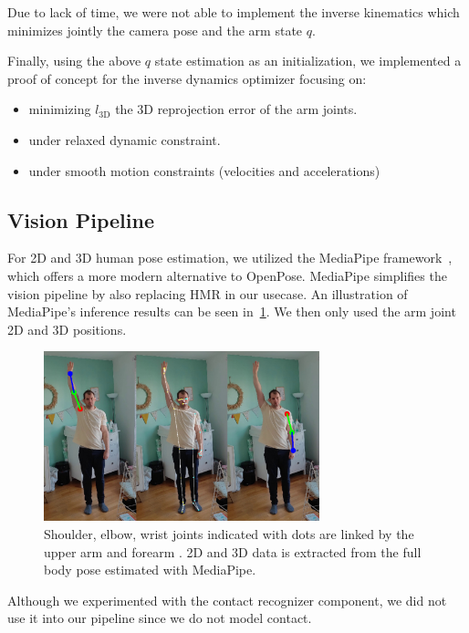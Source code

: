 Due to lack of time, we were not able to implement the inverse kinematics which minimizes jointly
the camera pose and the arm state $q$.

Finally, using the above $q$ state estimation as an initialization,
we implemented a proof of concept for the inverse dynamics optimizer focusing on:
\begin{itemize}
    \item minimizing $l_{\text{3D}}$ the 3D reprojection error of the arm joints.
    \item under relaxed dynamic constraint.
    \item under smooth motion constraints (velocities and accelerations)
\end{itemize}


\subsection{Vision Pipeline}
\label{subsec:vision_pipeline}

For 2D and 3D human pose estimation, we utilized the MediaPipe framework~\cite{lugaresi2019mediapipe}, which offers a more modern alternative 
to OpenPose. MediaPipe simplifies the vision pipeline by also replacing HMR in our usecase. An illustration of MediaPipe's inference results 
can be seen in~\cref{fig:mediapipe}. We then only used the arm joint 2D and 3D positions. 

\begin{figure}
    \centering
    \includegraphics[width=8cm]{figures/pose_detection_mediapipe_collage.png}
    \caption{
    \color{red}Shoulder, \color{lime}elbow, \color{blue}wrist \color{black} joints indicated with dots
    are linked by the \color{lime}upper arm \color{black} and \color{blue}forearm \color{black}. 2D and 3D data is extracted from
    the full body pose estimated with MediaPipe.
    }
    \label{fig:mediapipe}
\end{figure}

Although we experimented with the contact recognizer component, we did not use it into our pipeline since we do not model contact.

